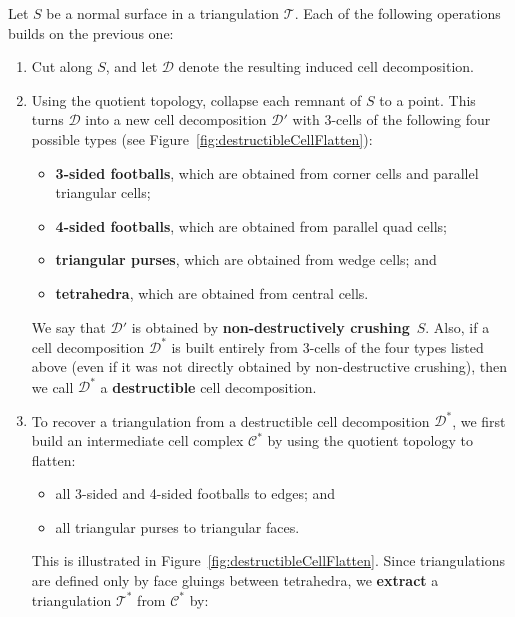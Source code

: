 \documentclass[a4paper,UKenglish,cleveref, autoref, thm-restate]{lipics-v2021}
\newcommand{\tri}{\mathcal{T}}
\begin{document}
\begin{definition}\label{defs:stages}
Let $S$ be a normal surface in a triangulation $\tri$.
Each of the following operations builds on the previous one:
\begin{enumerate}
    \item Cut along $S$, and let $\mathcal{D}$ denote the resulting induced cell decomposition.
    \item Using the quotient topology, collapse each remnant of $S$ to a point.
    This turns $\mathcal{D}$ into a new cell decomposition $\mathcal{D}'$
    with $3$-cells of the following four possible types
    (see Figure~\ref{fig:destructibleCellFlatten}):
    \begin{itemize}
        \item \textbf{3-sided footballs}, which are obtained from
        corner cells and parallel triangular cells;
        \item \textbf{4-sided footballs}, which are obtained from parallel quad cells;
        \item \textbf{triangular purses}, which are obtained from wedge cells; and
        \item \textbf{tetrahedra}, which are obtained from central cells.
    \end{itemize}
    We say that $\mathcal{D}'$ is obtained by \textbf{non-destructively crushing}~$S$.
    Also, if a cell decomposition $\mathcal{D}^\ast$ is built entirely from $3$-cells of the four types listed above
    (even if it was not directly obtained by non-destructive crushing),
    then we call $\mathcal{D}^\ast$ a \textbf{destructible} cell decomposition.
    \item\label{step:flatten} To recover a triangulation from a destructible cell decomposition $\mathcal{D}^\ast$,
    we first build an intermediate cell complex $\mathcal{C}^\ast$ by using the quotient topology to flatten:
    \begin{itemize}
        \item all 3-sided and 4-sided footballs to edges; and
        \item all triangular purses to triangular faces.
    \end{itemize}
    This is illustrated in Figure~\ref{fig:destructibleCellFlatten}.
    Since triangulations are defined only by face gluings between tetrahedra,
    we \textbf{extract} a triangulation $\tri^\ast$ from $\mathcal{C}^\ast$ by:
    \begin{itemize}

\end{itemize}
\end{enumerate}
\end{definition}
\end{document}
